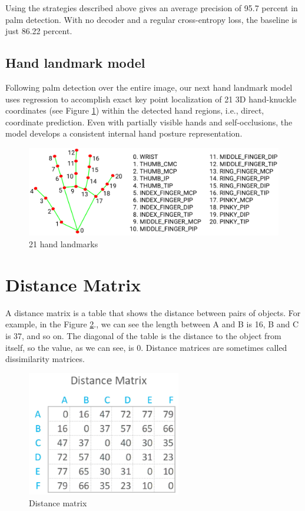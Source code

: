 Using the strategies described above gives an average precision of 95.7 percent in palm detection. With no decoder and a regular cross-entropy loss, the baseline is just 86.22 percent.

\subsection{Hand landmark model}
Following palm detection over the entire image, our next hand landmark model uses regression to accomplish exact key point localization of 21 3D hand-knuckle coordinates (see Figure \ref{fig:Chap3-HandLandMark}) within the detected hand regions, i.e., direct, coordinate prediction. Even with partially visible hands and self-occlusions, the model develops a consistent internal hand posture representation.
\begin{figure}[H]
	\centering
	\includegraphics[width=\textwidth]{img/Chap3/HandLandMark}
	\caption{ 21 hand landmarks }
	\label{fig:Chap3-HandLandMark}
\end{figure}


\section{Distance Matrix}

A distance matrix \cite{DistanceMatrix} is a table that shows the distance between pairs of objects. For example, in the Figure \ref{fig:Chap3-DM}., we can see the length between A and B is 16, B and C is 37, and so on. The diagonal of the table is the distance to the object from itself, so the value, as we can see, is 0. Distance matrices are sometimes called dissimilarity matrices.

\begin{figure}[H]
	\centering
	\includegraphics[width=0.6\textwidth]{img/Chap3/DM}
	\caption{ Distance matrix }
	\label{fig:Chap3-DM}
\end{figure}

